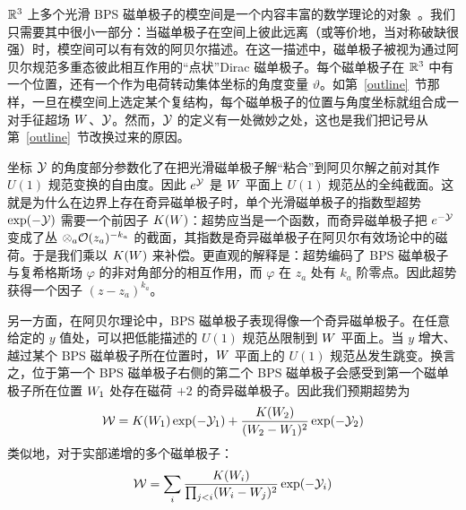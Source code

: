 ${\mathbb R}^3$ 上多个光滑 BPS 磁单极子的模空间是一个内容丰富的数学理论的对象~\cite{AH}。我们只需要其中很小一部分：当磁单极子在空间上彼此远离（或等价地，当对称破缺很强）时，模空间可以有有效的阿贝尔描述。在这一描述中，磁单极子被视为通过阿贝尔规范多重态彼此相互作用的“点状”Dirac 磁单极子。每个磁单极子在 ${\mathbb R}^3$ 中有一个位置，还有一个作为电荷转动集体坐标的角度变量 $\vartheta$。如第~\ref{outline}~节那样，一旦在模空间上选定某个复结构，每个磁单极子的位置与角度坐标就组合成一对手征超场 ${ W}$、${\mathcal Y}$。然而，${\mathcal Y}$ 的定义有一处微妙之处，这也是我们把记号从第~\ref{outline}~节改换过来的原因。



坐标 ${\mathcal Y}$ 的角度部分参数化了在把光滑磁单极子解“粘合”到阿贝尔解之前对其作 $U(1)$ 规范变换的自由度。因此 $e^{{\mathcal Y}}$ 是 ${ W}$ 平面上 $U(1)$ 规范丛的全纯截面。这就是为什么在边界上存在奇异磁单极子时，单个光滑磁单极子的指数型超势 $\exp(-{\mathcal Y})$ 需要一个前因子 $K({ W})$：超势应当是一个函数，而奇异磁单极子把 $e^{-{\mathcal Y}}$ 变成了丛 $\otimes_a {\cal O}(z_a)^{-k_a}$ 的截面，其指数是奇异磁单极子在阿贝尔有效场论中的磁荷。于是我们乘以 $K({ W})$ 来补偿。更直观的解释是：超势编码了 BPS 磁单极子与复希格斯场 $\varphi$ 的非对角部分的相互作用，而 $\varphi$ 在 $z_a$ 处有 $k_a$ 阶零点。因此超势获得一个因子 $(z-z_a)^{k_a}$。

另一方面，在阿贝尔理论中，BPS 磁单极子表现得像一个奇异磁单极子。在任意给定的 $y$ 值处，可以把低能描述的 $U(1)$ 规范丛限制到 ${ W}$ 平面上。当 $y$ 增大、越过某个 BPS 磁单极子所在位置时，${ W}$ 平面上的 $U(1)$ 规范丛发生跳变。换言之，位于第一个 BPS 磁单极子右侧的第二个 BPS 磁单极子会感受到第一个磁单极子所在位置 ${ W}_1$ 处存在磁荷 $+2$ 的奇异磁单极子。因此我们预期超势为
\begin{equation}
{\mathcal W}=K({ W}_1)\exp(-{\mathcal Y}_1) + \frac{K({ W}_2)}{({ W}_2 - { W}_1)^2}\exp(-{\mathcal Y}_2)
\end{equation}
类似地，对于实部递增的多个磁单极子：
\begin{equation}
{\mathcal W}=\sum_i \frac{K({ W}_i)}{\prod_{j<i} ({ W}_i - { W}_j)^2}\exp(-{\mathcal Y}_i)
\end{equation}


